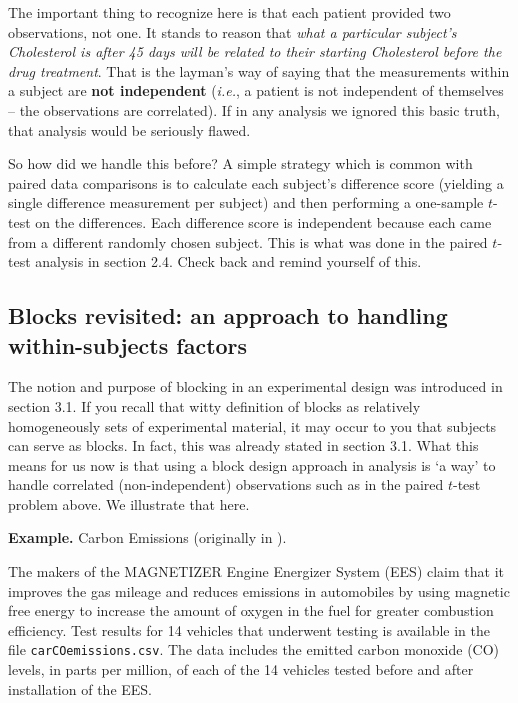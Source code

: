\documentclass[
]{book}
\begin{document}
The important thing to recognize here is that each patient provided two observations, not one.
It stands to reason that \emph{what a particular subject's Cholesterol is after 45 days will be related to their starting Cholesterol before the drug treatment}.
That is the layman's way of saying that the measurements within a subject are \textbf{not independent} (\emph{i.e.}, a patient is not independent of themselves -- the observations are correlated).
If in any analysis we ignored this basic truth, that analysis would be seriously flawed.

So how did we handle this before?
A simple strategy which is common with paired data comparisons is to calculate each subject's difference score (yielding a single difference measurement per subject) and then performing a one-sample \(t\)-test on the differences.
Each difference score is independent because each came from a different randomly chosen subject.
This is what was done in the paired \(t\)-test analysis in section 2.4. Check back and remind yourself of this.

\hypertarget{blocks-revisited-an-approach-to-handling-within-subjects-factors}{%
\subsection{Blocks revisited: an approach to handling within-subjects factors}\label{blocks-revisited-an-approach-to-handling-within-subjects-factors}}

The notion and purpose of blocking in an experimental design was introduced in section 3.1.
If you recall that witty definition of blocks as relatively homogeneously sets of experimental material, it may occur to you that subjects can serve as blocks.
In fact, this was already stated in section 3.1.
What this means for us now is that using a block design approach in analysis is `a way' to handle correlated (non-independent) observations such as in the paired \(t\)-test problem above.
We illustrate that here.

\textbf{Example.} Carbon Emissions (originally in \citet{WeissText}).

The makers of the MAGNETIZER Engine Energizer System (EES) claim that it improves the gas mileage and reduces emissions in automobiles by using magnetic free energy to increase the amount of oxygen in the fuel for greater combustion efficiency.
Test results for 14 vehicles that underwent testing is available in the file \texttt{carCOemissions.csv}.
The data includes the emitted carbon monoxide (CO) levels, in parts per million, of each of the 14 vehicles tested before and after installation of the EES.
\end{document}
